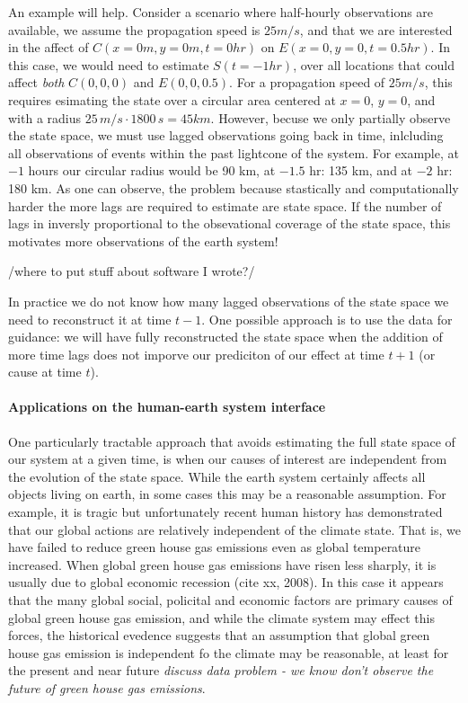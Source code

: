 \documentclass[12pt]{article}
\begin{document}
An example will help. Consider a scenario where half-hourly
observations are available, we assume the propagation speed is
$25 m/s$, and that we are interested in the affect of
$C(x=0 m, y=0 m, t=0 hr)$ on $E(x=0, y=0, t=0.5 hr)$. In this case, we
would need to estimate $S(t=-1 hr)$, over all locations that could
affect \emph{both} $C(0,0,0)$ and $E(0,0,0.5)$.  For a propagation
speed of $25 m/s$, this requires esimating the state over a circular
area centered at $x=0$, $y=0$, and with a radius
$25 \, m/s \cdot 1800 \, s = 45 km$. However, becuse we only partially
observe the state space, we must use lagged observations going back in
time, inlcluding all observations of events within the past lightcone
of the system. For example, at $-1$ hours our circular radius would be
90 km, at $-1.5$ hr: 135 km, and at $-2$ hr: 180 km. As one can
observe, the problem because stastically and computationally harder
the more lags are required to estimate are state space. If the number
of lags in inversly proportional to the obsevational coverage of the
state space, this motivates more observations of the earth system!

/where to put stuff about software I wrote?/

In practice we do not know how many lagged observations of the state
space we need to reconstruct it at time $t-1$. One possible approach
is to use the data for guidance: we will have fully reconstructed the
state space when the addition of more time lags does not imporve our
prediciton of our effect at time \(t+1\) (or cause at time $t$).


\paragraph{Applications on the human-earth system interface}

One particularly tractable approach that avoids estimating the full
state space of our system at a given time, is when our causes of
interest are independent from the evolution of the state space. While
the earth system certainly affects all objects living on earth, in
some cases this may be a reasonable assumption. For example, it is
tragic but unfortunately recent human history has demonstrated that
our global actions are relatively independent of the climate
state. That is, we have failed to reduce green house gas emissions
even as global temperature increased. When global green house gas
emissions have risen less sharply, it is usually due to global
economic recession (cite xx, 2008). In this case it appears that the
many global social, policital and economic factors are primary causes
of global green house gas emission, and while the climate system may
effect this forces, the historical evedence suggests that an
assumption that global green house gas emission is independent fo the
climate may be reasonable, at least for the present and near future
\emph{discuss data problem - we know don't observe the future of green
  house gas emissions}.
\end{document}
